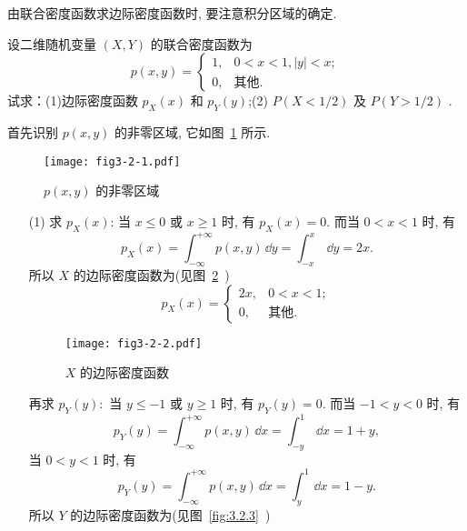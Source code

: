   由联合密度函数求边际密度函数时, 要注意积分区域的确定.
  \begin{example}\label{exam:3.2.3}
  	设二维随机变量 $(X,Y)$ 的联合密度函数为
  	\begin{equation*}
  	p(x,y)=
  	\begin{cases}
  	1, & 0<x<1,|y|<x;\\
  	0, & \text{其他}.
  	\end{cases}
  	\end{equation*}
  	试求：(1)边际密度函数 $p_{X}(x)$ 和 $p_{Y}(y)$;(2) $P(X<1/2)$ 及 $P(Y>1/2)$ .
  \end{example}
  \begin{solution}
  	首先识别 $p(x,y)$ 的非零区域, 它如图~\ref{fig:3.2.1} 所示.
  	\begin{figure}[htbp]
  		\centering
  		\texttt{[image: fig3-2-1.pdf]}
  		\caption{$p(x,y)$ 的非零区域}\label{fig:3.2.1}
  	\end{figure}
  	\begin{itemize}
  		\item[(1)]求 $p_X(x)$: 当 $x\leqslant0$ 或 $x\geqslant1$ 时, 有 $p_X(x)=0$. 而当 $0<x<1$ 时, 有
  		\begin{equation*}
  		p_X(x)=\int_{-\infty}^{+\infty}p(x,y)\,\dd y=\int_{-x}^{x}\,\dd y=2x.
  		\end{equation*}
  		所以 $X$ 的边际密度函数为(见图~\ref{fig:3.2.2}~)
  		\begin{equation*}
  		p_X(x)=
  		\begin{cases}
  		2x, & 0<x<1;\\
  		0, & \text{其他}.
  		\end{cases}
  		\end{equation*}
  		\begin{figure}[h]
  			\centering
  			\texttt{[image: fig3-2-2.pdf]}
  			\caption{$X$ 的边际密度函数}\label{fig:3.2.2}
  		\end{figure}
  		再求 $p_Y(y):$ 当 $y\leqslant-1$ 或 $y\geqslant1$ 时, 有 $p_Y(y)=0$. 而当 $-1<y<0$ 时, 有
  		\begin{equation*}
  		p_Y(y)=\int_{-\infty}^{+\infty}p(x,y)\,\dd x=\int_{-y}^{1}\,\dd x=1+y,
  		\end{equation*}
  		当 $0<y<1$ 时, 有
  		\begin{equation*}
  		p_Y(y)=\int_{-\infty}^{+\infty}p(x,y)\,\dd x=\int_{y}^{1}\,\dd x=1-y.
  		\end{equation*}
  		所以 $Y$ 的边际密度函数为(见图~\ref{fig:3.2.3}~)
  		\begin{equation*}

\end{equation*}
\end{itemize}
\end{solution}
